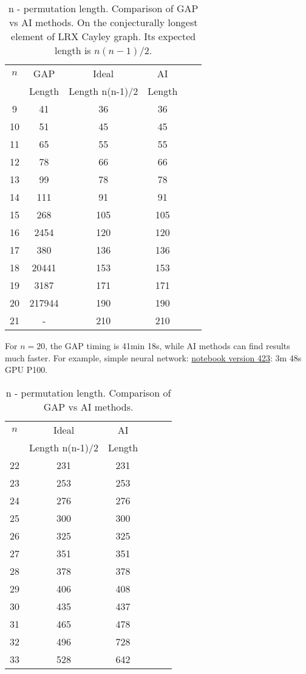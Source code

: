 \documentclass[atmp]{ipart_v1}
\numberwithin{equation}{section}
\theoremstyle{plain}%
\begin{document}
\begin{table}[h]
  \centering
  \begin{tabular}{|c|c|c|c|c|c|}
  \hline
  $n$  &  GAP  & Ideal  & AI  \\
 &  Length & Length n(n-1)/2  & Length  \\
  \hline
  9  &  41 & 36 &  36 \\
  \hline
  10 &  51 & 45 &  45 \\
  \hline
  11 & 65  & 55 &  55 \\
  \hline
  12 &  78 &  66  & 66 \\
  \hline  
  13 &  99 &  78 & 78 \\
  \hline  
  14 & 111 &  91 & 91 \\
  \hline  
  15 & 268  &  105 &  105  \\
  \hline  
  16 &  2454  &  120 &  120 \\
  \hline  
  17 & 380 &  136 & 136  \\
  \hline  
  18 & 20441 & 153  & 153  \\
  \hline  
  19 &  3187  & 171  & 171  \\
  \hline  
  20 & 217944  & 190  & 190  \\
  \hline 
  21 & - & 210 & 210  \\
  \hline 
  \end{tabular}
  \captionsetup{skip=10pt} 
  \caption{n - permutation length. Comparison of GAP vs AI methods. On the conjecturally longest element of LRX Cayley graph. Its expected length is $n(n-1)/2$.  }
  \label{tab:example}
\end{table}
For $n=20$, the GAP timing is 41min 18s, while AI methods can find results much faster.
For example, simple neural network: \href{https://www.kaggle.com/code/alexandervc/lrx-cayleypy-rl-mdqn?scriptVersionId=224270083}{notebook version 423}: 3m 48s GPU P100.

\begin{table}[h]
  \centering
  \begin{tabular}{|c|c|c|c|c|c|}
  \hline
  $n$  & Ideal  & AI  \\
 & Length n(n-1)/2  & Length  \\
  \hline
  22  & 231 & 231 \\
  \hline
  23  & 253 & 253 \\
  \hline
  24  &  276  & 276 \\
  \hline
  25  &  300  & 300 \\
  \hline
  26  & 325 & 325 \\
  \hline
  27  & 351 & 351 \\
  \hline
  28  & 378 & 378 \\
  \hline
  29  & 406 & 408 \\
  \hline
  30  & 435 & 437 \\
  \hline
  31  &  465  & 478 \\
  \hline
  32  &  496  & 728 \\
  \hline
  33  &  528  & 642 \\
  \hline 
  \end{tabular}
  \captionsetup{skip=10pt} 
  \caption{n - permutation length. Comparison of GAP vs AI methods. }
  \label{tab:example_nn}
\end{table}
\end{document}
